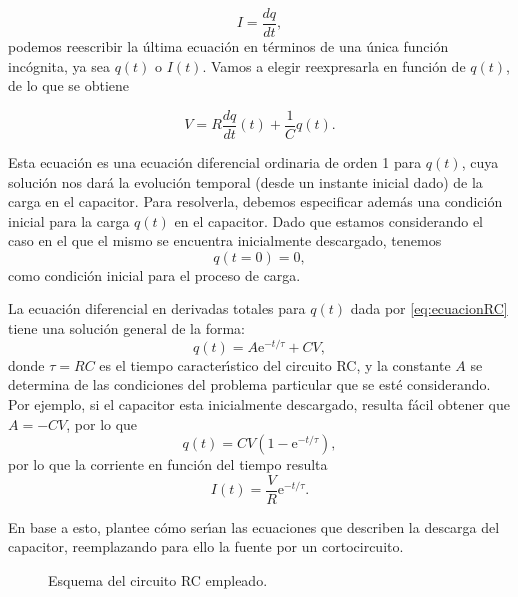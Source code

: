 \documentclass[laboratorio]{guia}
\begin{document}
$$ I = \frac{dq}{dt}, $$
podemos reescribir la \'ultima ecuaci\'on en t\'erminos de una \'unica
funci\'on inc\'ognita, ya sea $q(t)$ o $I(t)$. Vamos a elegir reexpresarla en
funci\'on de $q(t)$, de lo que se obtiene

\begin{equation}
    V = R \frac{dq}{dt}(t) + \frac{1}{C} q(t).
    \label{eq:ecuacionRC}
\end{equation}

Esta ecuaci\'on es una ecuaci\'on diferencial ordinaria de orden 1 para $q(t)$, 
cuya soluci\'on nos dar\'a la evoluci\'on temporal (desde un instante inicial
dado) de la carga en el capacitor. 
Para resolverla, debemos especificar adem\'as una condici\'on inicial para la 
carga $q(t)$ en el capacitor. Dado que estamos considerando el caso en el que
el mismo se encuentra inicialmente descargado, tenemos
\begin{equation}
    q(t=0) = 0,
\end{equation}
como condici\'on inicial para el proceso de carga. 

La ecuaci\'on diferencial en derivadas totales para $q(t)$ dada por
\eqref{eq:ecuacionRC} tiene una soluci\'on general de la forma:
\begin{equation}
    q(t) = A \text{e}^{-t/\tau} + CV,
\end{equation}
donde $\tau = RC$ es el tiempo caracter\'\i stico del circuito RC, y la
constante $A$ se determina de las condiciones del problema particular que se
est\'e considerando. Por ejemplo, si el capacitor esta inicialmente descargado,
resulta f\'acil obtener que $A = -CV$, por lo que
\begin{equation*}
    q(t) = CV \left(1 - \text{e}^{-t/\tau} \right),
\end{equation*}
por lo que la corriente en funci\'on del tiempo resulta
\begin{equation*}
    I(t) = \frac{V}{R} \text{e}^{-t/\tau}.
\end{equation*}

En base a esto, plantee c\'omo ser\'\i an las ecuaciones que describen la
descarga del capacitor, reemplazando para ello la fuente por un cortocircuito.


\begin{figure}[t!]
    \centering
    \vspace{0.5cm}
    \caption{Esquema del circuito RC empleado.}
    \label{fig:circuitoRC}
\end{figure}
\end{document}
